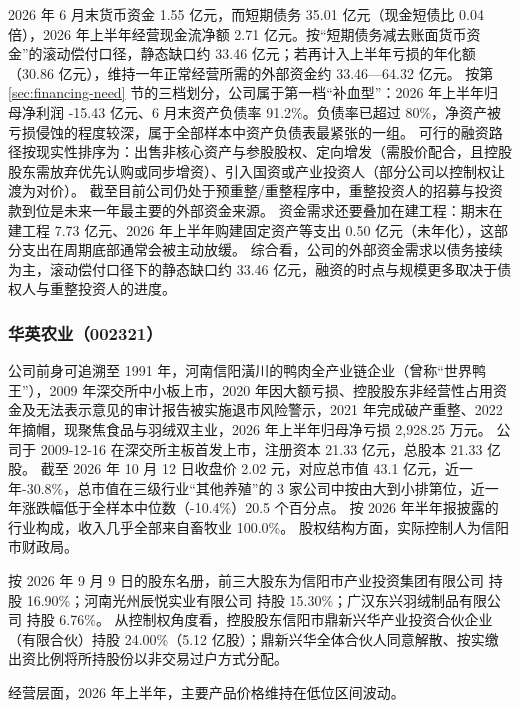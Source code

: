  2026 年 6 月末货币资金 1.55 亿元，而短期债务 35.01 亿元（现金短债比 0.04 倍），2026 年上半年经营现金流净额 2.71 亿元。按“短期债务减去账面货币资金”的滚动偿付口径，静态缺口约 33.46 亿元；若再计入上半年亏损的年化额（30.86 亿元），维持一年正常经营所需的外部资金约 33.46---64.32 亿元。 按第 \ref{sec:financing-need} 节的三档划分，公司属于第一档“补血型”：2026 年上半年归母净利润 -15.43 亿元、6 月末资产负债率 91.2\%。负债率已超过 80\%，净资产被亏损侵蚀的程度较深，属于全部样本中资产负债表最紧张的一组。 可行的融资路径按现实性排序为：出售非核心资产与参股股权、定向增发（需股价配合，且控股股东需放弃优先认购或同步增资）、引入国资或产业投资人（部分公司以控制权让渡为对价）。 截至目前公司仍处于预重整/重整程序中，重整投资人的招募与投资款到位是未来一年最主要的外部资金来源。 资金需求还要叠加在建工程：期末在建工程 7.73 亿元、2026 年上半年购建固定资产等支出 0.50 亿元（未年化），这部分支出在周期底部通常会被主动放缓。 综合看，公司的外部资金需求以债务接续为主，滚动偿付口径下的静态缺口约 33.46 亿元，融资的时点与规模更多取决于债权人与重整投资人的进度。




\subsubsection{华英农业（002321）}
\label{co:002321}

 公司前身可追溯至 1991 年，河南信阳潢川的鸭肉全产业链企业（曾称“世界鸭王”），2009 年深交所中小板上市，2020 年因大额亏损、控股股东非经营性占用资金及无法表示意见的审计报告被实施退市风险警示，2021 年完成破产重整、2022 年摘帽，现聚焦食品与羽绒双主业，2026 年上半年归母净亏损 2,928.25 万元。 公司于 2009-12-16 在深交所主板首发上市，注册资本 21.33 亿元，总股本 21.33 亿股。 截至 2026 年 10 月 12 日收盘价 2.02 元，对应总市值 43.1 亿元，近一年-30.8\%，总市值在三级行业“其他养殖”的 3 家公司中按由大到小排第位，近一年涨跌幅低于全样本中位数（-10.4\%）20.5 个百分点。 按 2026 年半年报披露的行业构成，收入几乎全部来自畜牧业 100.0\%。 股权结构方面，实际控制人为信阳市财政局。

 按 2026 年 9 月 9 日的股东名册，前三大股东为信阳市产业投资集团有限公司 持股 16.90\%；河南光州辰悦实业有限公司 持股 15.30\%；广汉东兴羽绒制品有限公司 持股 6.76\%。 从控制权角度看，控股股东信阳市鼎新兴华产业投资合伙企业（有限合伙）持股 24.00\%（5.12 亿股）；鼎新兴华全体合伙人同意解散、按实缴出资比例将所持股份以非交易过户方式分配。

 经营层面，2026 年上半年，主要产品价格维持在低位区间波动。


